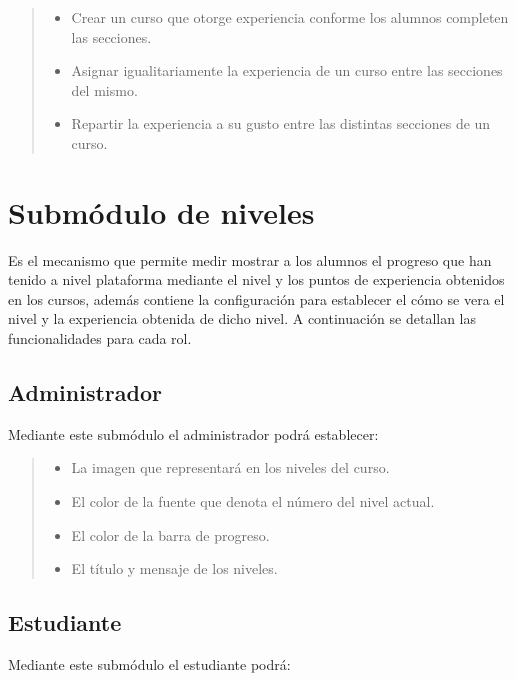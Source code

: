     \begin{quote}
    \begin{itemize}
        \item Crear un curso que otorge experiencia conforme los alumnos completen las secciones.
        \item Asignar igualitariamente la experiencia de un curso entre las secciones del mismo.
        \item Repartir la experiencia a su gusto entre las distintas secciones de un curso.
    \end{itemize}
    \end{quote}


\section{Submódulo de niveles}

Es el mecanismo que permite medir mostrar a los alumnos el progreso que han tenido a nivel plataforma mediante el nivel y los puntos de experiencia obtenidos en los cursos, además contiene la configuración para establecer el cómo se vera el nivel y la experiencia obtenida de dicho nivel. A continuación se detallan las funcionalidades para cada rol. %

\subsection*{Administrador}
\noindent Mediante este submódulo el administrador podrá establecer:

    \begin{quote}
    \begin{itemize}
        \item La imagen que representará en los niveles del curso.
        \item El color de la fuente que denota el número del nivel actual.
        \item El color de la barra de progreso.
        \item El título y mensaje de los niveles.
    \end{itemize}
    \end{quote}

\subsection*{Estudiante}
\noindent Mediante este submódulo el estudiante podrá:


